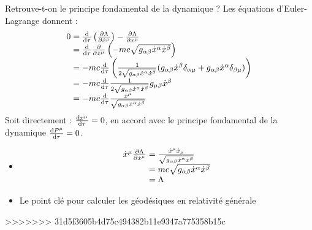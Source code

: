 Retrouve-t-on le principe fondamental de la dynamique ? Les équations d'Euler-Lagrange donnent :
$$
	\begin{array}{r@{\;}l}
		0&=\frac{\dif}{\dif \tau}\left(\frac{\partial\Lambda}{\partial\dot{x}^\mu}\right)-\frac{\partial\Lambda}{\partial x^\mu}\\
			&=\frac{\dif}{\dif\tau}\frac{\partial}{\partial\dot{x}^\mu}\left(-mc\sqrt{g_{\alpha\beta}\dot{x}^{\alpha}\dot{x}^{\beta}}\right)\\
			&=-mc\frac{\dif}{\dif\tau}\left(\frac{1}{2\sqrt{g_{\alpha\beta}\dot{x}^{\alpha}\dot{x}^{\beta}}}( g_{\alpha\beta}\dot{x}^{\beta}\delta_{\alpha\mu}+g_{\alpha\beta}\dot{x}^{\alpha}\delta_{\beta\mu})\right)\\
			&=-mc\frac{\dif}{\dif\tau}\frac{1}{2\sqrt{g_{\alpha\beta}\dot{x}^{\alpha}\dot{x}^{\beta}}}g_{\mu\beta}\dot{x}^{\beta}\\
			&=-mc\frac{\dif}{\dif\tau}\frac{\dot{x}^\mu}{\sqrt{g_{\alpha\beta}\dot{x}^{\alpha}\dot{x}^{\beta}}}
	\end{array}
$$
Soit directement : $\frac{\mathrm{d}\dot{x^\mu}}{\mathrm{d}\tau}=0$, en accord avec le principe fondamental de la dynamique $\frac{\mathrm{d} P^\mu}{\mathrm{d}\tau}=0$.

\begin{remarks}\hspace*{1pt}
	\begin{itemize}
		\item 
		$$
			\begin{array}{r@{\;}l}
				\dot{x}^\mu\frac{\partial\Lambda}{\partial\dot{x}^\mu}&=\frac{\dot{x}^\mu\dot{x}_\mu}{\sqrt{g_{\alpha\beta}\dot{x}^{\alpha}\dot{x}^{\beta}}}\\
					&=mc\sqrt{g_{\alpha\beta}\dot{x}^{\alpha}\dot{x}^{\beta}}\\
					&=\Lambda
			\end{array}
		$$
		\item Le point clé pour calculer les géodésiques en relativité générale 
		
	\end{itemize}
\end{remarks}
>>>>>>> 31d5f3605b4d75c494382b11e9347a775358b15c
